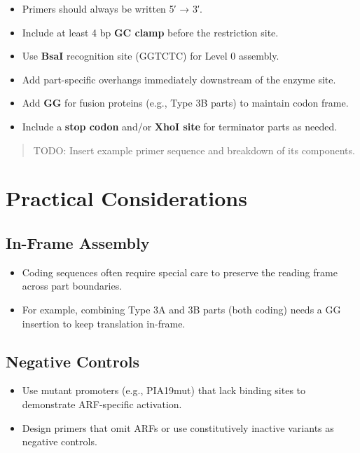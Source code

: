 \documentclass[
  letterpaper,
  DIV=11,
  numbers=noendperiod]{scrreprt}
\providecommand{\tightlist}{%
  \setlength{\itemsep}{0pt}\setlength{\parskip}{0pt}}\usepackage{longtable,booktabs,array}
\begin{document}
\begin{itemize}
\tightlist
\item
  Primers should always be written 5′ → 3′.
\item
  Include at least 4 bp \textbf{GC clamp} before the restriction site.
\item
  Use \textbf{BsaI} recognition site (GGTCTC) for Level 0 assembly.
\item
  Add part-specific overhangs immediately downstream of the enzyme site.
\item
  Add \textbf{GG} for fusion proteins (e.g., Type 3B parts) to maintain
  codon frame.
\item
  Include a \textbf{stop codon} and/or \textbf{XhoI site} for terminator
  parts as needed.
\end{itemize}

\begin{quote}
TODO: Insert example primer sequence and breakdown of its components.
\end{quote}

\section{Practical Considerations}\label{practical-considerations}

\subsection{In-Frame Assembly}\label{in-frame-assembly}

\begin{itemize}
\tightlist
\item
  Coding sequences often require special care to preserve the reading
  frame across part boundaries.
\item
  For example, combining Type 3A and 3B parts (both coding) needs a GG
  insertion to keep translation in-frame.
\end{itemize}

\subsection{Negative Controls}\label{negative-controls}

\begin{itemize}
\tightlist
\item
  Use mutant promoters (e.g., PIA19mut) that lack binding sites to
  demonstrate ARF-specific activation.
\item
  Design primers that omit ARFs or use constitutively inactive variants
  as negative controls.
\end{itemize}
\end{document}

